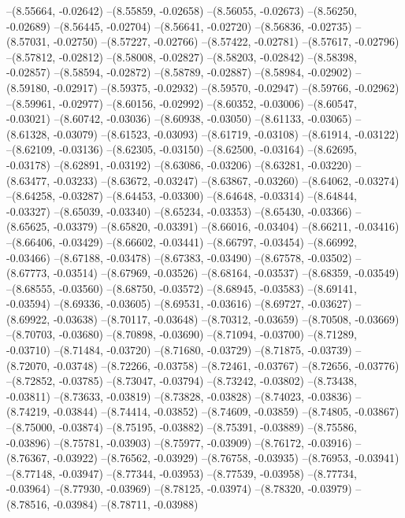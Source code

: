 --(8.55664, -0.02642)
--(8.55859, -0.02658)
--(8.56055, -0.02673)
--(8.56250, -0.02689)
--(8.56445, -0.02704)
--(8.56641, -0.02720)
--(8.56836, -0.02735)
--(8.57031, -0.02750)
--(8.57227, -0.02766)
--(8.57422, -0.02781)
--(8.57617, -0.02796)
--(8.57812, -0.02812)
--(8.58008, -0.02827)
--(8.58203, -0.02842)
--(8.58398, -0.02857)
--(8.58594, -0.02872)
--(8.58789, -0.02887)
--(8.58984, -0.02902)
--(8.59180, -0.02917)
--(8.59375, -0.02932)
--(8.59570, -0.02947)
--(8.59766, -0.02962)
--(8.59961, -0.02977)
--(8.60156, -0.02992)
--(8.60352, -0.03006)
--(8.60547, -0.03021)
--(8.60742, -0.03036)
--(8.60938, -0.03050)
--(8.61133, -0.03065)
--(8.61328, -0.03079)
--(8.61523, -0.03093)
--(8.61719, -0.03108)
--(8.61914, -0.03122)
--(8.62109, -0.03136)
--(8.62305, -0.03150)
--(8.62500, -0.03164)
--(8.62695, -0.03178)
--(8.62891, -0.03192)
--(8.63086, -0.03206)
--(8.63281, -0.03220)
--(8.63477, -0.03233)
--(8.63672, -0.03247)
--(8.63867, -0.03260)
--(8.64062, -0.03274)
--(8.64258, -0.03287)
--(8.64453, -0.03300)
--(8.64648, -0.03314)
--(8.64844, -0.03327)
--(8.65039, -0.03340)
--(8.65234, -0.03353)
--(8.65430, -0.03366)
--(8.65625, -0.03379)
--(8.65820, -0.03391)
--(8.66016, -0.03404)
--(8.66211, -0.03416)
--(8.66406, -0.03429)
--(8.66602, -0.03441)
--(8.66797, -0.03454)
--(8.66992, -0.03466)
--(8.67188, -0.03478)
--(8.67383, -0.03490)
--(8.67578, -0.03502)
--(8.67773, -0.03514)
--(8.67969, -0.03526)
--(8.68164, -0.03537)
--(8.68359, -0.03549)
--(8.68555, -0.03560)
--(8.68750, -0.03572)
--(8.68945, -0.03583)
--(8.69141, -0.03594)
--(8.69336, -0.03605)
--(8.69531, -0.03616)
--(8.69727, -0.03627)
--(8.69922, -0.03638)
--(8.70117, -0.03648)
--(8.70312, -0.03659)
--(8.70508, -0.03669)
--(8.70703, -0.03680)
--(8.70898, -0.03690)
--(8.71094, -0.03700)
--(8.71289, -0.03710)
--(8.71484, -0.03720)
--(8.71680, -0.03729)
--(8.71875, -0.03739)
--(8.72070, -0.03748)
--(8.72266, -0.03758)
--(8.72461, -0.03767)
--(8.72656, -0.03776)
--(8.72852, -0.03785)
--(8.73047, -0.03794)
--(8.73242, -0.03802)
--(8.73438, -0.03811)
--(8.73633, -0.03819)
--(8.73828, -0.03828)
--(8.74023, -0.03836)
--(8.74219, -0.03844)
--(8.74414, -0.03852)
--(8.74609, -0.03859)
--(8.74805, -0.03867)
--(8.75000, -0.03874)
--(8.75195, -0.03882)
--(8.75391, -0.03889)
--(8.75586, -0.03896)
--(8.75781, -0.03903)
--(8.75977, -0.03909)
--(8.76172, -0.03916)
--(8.76367, -0.03922)
--(8.76562, -0.03929)
--(8.76758, -0.03935)
--(8.76953, -0.03941)
--(8.77148, -0.03947)
--(8.77344, -0.03953)
--(8.77539, -0.03958)
--(8.77734, -0.03964)
--(8.77930, -0.03969)
--(8.78125, -0.03974)
--(8.78320, -0.03979)
--(8.78516, -0.03984)
--(8.78711, -0.03988)
